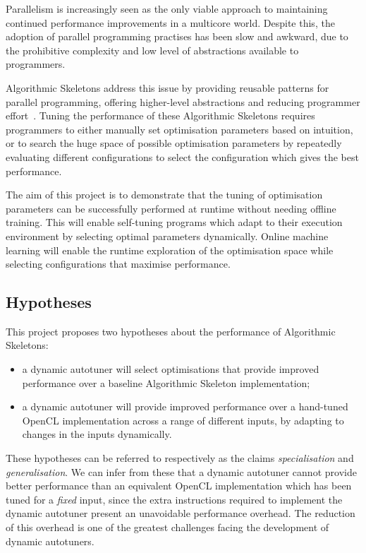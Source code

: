 Parallelism is increasingly seen as the only viable approach to
maintaining continued performance improvements in a multicore
world. Despite this, the adoption of parallel programming practises
has been slow and awkward, due to the prohibitive complexity and low
level of abstractions available to programmers.

Algorithmic Skeletons address this issue by providing reusable
patterns for parallel programming, offering higher-level abstractions
and reducing programmer effort~\cite{Cole1989, Cole2004}. Tuning the
performance of these Algorithmic Skeletons requires programmers to
either manually set optimisation parameters based on intuition, or to
search the huge space of possible optimisation parameters by
repeatedly evaluating different configurations to select the
configuration which gives the best performance.

The aim of this project is to demonstrate that the tuning of
optimisation parameters can be successfully performed at runtime
without needing offline training. This will enable self-tuning
programs which adapt to their execution environment by selecting
optimal parameters dynamically. Online machine learning will enable
the runtime exploration of the optimisation space while selecting
configurations that maximise performance.

\subsection{Hypotheses}
This project proposes two hypotheses about the performance of
Algorithmic Skeletons:
\begin{itemize}
\item a dynamic autotuner will select optimisations that provide
  improved performance over a baseline Algorithmic Skeleton
  implementation;
\item a dynamic autotuner will provide improved performance over a
  hand-tuned OpenCL implementation across a range of different inputs,
  by adapting to changes in the inputs dynamically.
\end{itemize}

These hypotheses can be referred to respectively as the claims
\emph{specialisation} and \emph{generalisation}. We can infer from
these that a dynamic autotuner cannot provide better performance than
an equivalent OpenCL implementation which has been tuned for a
\emph{fixed} input, since the extra instructions required to implement
the dynamic autotuner present an unavoidable performance overhead. The
reduction of this overhead is one of the greatest challenges facing
the development of dynamic autotuners.


